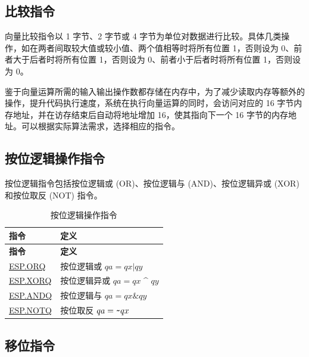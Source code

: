 \documentclass[main\_\_CN.tex]{subfiles}
\begin{document}
\subsection{比较指令}
\label{sec:pie-comparison-instructions}

向量比较指令以 1 字节、2 字节或 4 字节为单位对数据进行比较。具体几类操作，如在两者间取较大值或较小值、两个值相等时将所有位置 1，否则设为 0、前者大于后者时将所有位置 1，否则设为 0、前者小于后者时将所有位置 1，否则设为 0。

鉴于向量运算所需的输入输出操作数都存储在内存中，为了减少读取内存等额外的操作，提升代码执行速度，系统在执行向量运算的同时，会访问对应的 16 字节内存地址，并在访存结束后自动将地址增加 16，使其指向下一个 16 字节的内存地址。可以根据实际算法需求，选择相应的指令。




\subsection{按位逻辑操作指令}
\label{sec:pie-bitwise-logic-instructions}

按位逻辑指令包括按位逻辑或 (OR)、按位逻辑与 (AND)、按位逻辑异或 (XOR) 和按位取反 (NOT) 指令。

\begin{longtable}[c]{|l|m{10cm}|}
    \caption{按位逻辑操作指令}
    \label{tab:pie-bitwise-logic-instructions}\\
    \hline
    \rowcolor{lightgray}
    \textbf{指令} & \textbf{定义} \\\hline
    \endfirsthead
    \rowcolor{lightgray}
    \textbf{指令} & \textbf{定义} \\\hline
    \endhead
    \endfoot

    \hyperref[instruction:ESPORQ]{ESP.ORQ} & 按位逻辑或 $qa = qx | qy$
    \\\hline
    \hyperref[instruction:ESPXORQ]{ESP.XORQ} & 按位逻辑异或 $qa = qx$ \^{} $qy$
    \\\hline
    \hyperref[instruction:ESPANDQ]{ESP.ANDQ} & 按位逻辑与 $qa = qx \& qy$
    \\\hline
    \hyperref[instruction:ESPNOTQ]{ESP.NOTQ} & 按位取反 $qa =\verb+~+ qx$
    \\\hline
\end{longtable}

\subsection{移位指令}
\label{sec:pie-shift-instructions}
\end{document}
